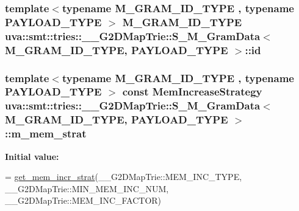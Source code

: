 \subsubsection[{id}]{\setlength{\rightskip}{0pt plus 5cm}template$<$typename M\+\_\+\+G\+R\+A\+M\+\_\+\+I\+D\+\_\+\+T\+Y\+P\+E , typename P\+A\+Y\+L\+O\+A\+D\+\_\+\+T\+Y\+P\+E $>$ M\+\_\+\+G\+R\+A\+M\+\_\+\+I\+D\+\_\+\+T\+Y\+P\+E {\bf uva\+::smt\+::tries\+::\+\_\+\+\_\+\+G2\+D\+Map\+Trie\+::\+S\+\_\+\+M\+\_\+\+Gram\+Data}$<$ M\+\_\+\+G\+R\+A\+M\+\_\+\+I\+D\+\_\+\+T\+Y\+P\+E, P\+A\+Y\+L\+O\+A\+D\+\_\+\+T\+Y\+P\+E $>$\+::id}\label{structuva_1_1smt_1_1tries_1_1_____g2_d_map_trie_1_1_s___m___gram_data_a3a7ce360e1a56c5b9f067a66de90c300}
\hypertarget{structuva_1_1smt_1_1tries_1_1_____g2_d_map_trie_1_1_s___m___gram_data_a8555512bef5fb68546af7cb50ae2ebd0}{}
\subsubsection[{m\+\_\+mem\+\_\+strat}]{\setlength{\rightskip}{0pt plus 5cm}template$<$typename M\+\_\+\+G\+R\+A\+M\+\_\+\+I\+D\+\_\+\+T\+Y\+P\+E , typename P\+A\+Y\+L\+O\+A\+D\+\_\+\+T\+Y\+P\+E $>$ const {\bf Mem\+Increase\+Strategy} {\bf uva\+::smt\+::tries\+::\+\_\+\+\_\+\+G2\+D\+Map\+Trie\+::\+S\+\_\+\+M\+\_\+\+Gram\+Data}$<$ M\+\_\+\+G\+R\+A\+M\+\_\+\+I\+D\+\_\+\+T\+Y\+P\+E, P\+A\+Y\+L\+O\+A\+D\+\_\+\+T\+Y\+P\+E $>$\+::m\+\_\+mem\+\_\+strat\hspace{0.3cm}{\ttfamily [static]}}\label{structuva_1_1smt_1_1tries_1_1_____g2_d_map_trie_1_1_s___m___gram_data_a8555512bef5fb68546af7cb50ae2ebd0}
{\bfseries Initial value\+:}
\begin{DoxyCode}
=
                \hyperlink{namespaceuva_1_1smt_1_1tries_1_1alloc_aa5cce127acd56e3fa1b42c63f93f8548}{get\_mem\_incr\_strat}(\_\_G2DMapTrie::MEM\_INC\_TYPE,
                        \_\_G2DMapTrie::MIN\_MEM\_INC\_NUM, \_\_G2DMapTrie::MEM\_INC\_FACTOR)
\end{DoxyCode}
\hypertarget{structuva_1_1smt_1_1tries_1_1_____g2_d_map_trie_1_1_s___m___gram_data_a3dcc7bf22bca173a149dff6c1aac9ab1}{}
